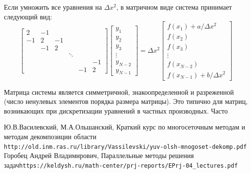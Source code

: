 \documentclass[a4paper, 11pt]{article}
\begin{document}
Если умножить все уравнения на $\Delta x ^2$, в матричном виде система принимает следующий вид:
\begin{equation}
	\begin{bmatrix}
		2  & -1 &   &       \\
		-1 &  2 & -1 \\
		   & -1 &  2 \\
		   &    &   & \ddots \\
		   &    &   &       &  & -1\\
		   &    &   &       & -1 & 2
		
	\end{bmatrix}
	\begin{bmatrix}
		y_1 \\ y_2 \\ y_3 \\ \vdots \\y_{N-2} \\ y_{N-1}
	\end{bmatrix}
	=
	\Delta x^2 
	\begin{bmatrix}
		f(x_1) + a/\Delta x^2 \\
		f(x_2)\\
		f(x_3)\\
		\vdots\\
		f(x_{N-2})\\
		f(x_{N-1}) + b/\Delta x^2 
	\end{bmatrix}
\end{equation}

Матрица системы является симметричной, знакоопределенной и разреженной (число ненулевых элементов порядка размера матрицы). Это типично для матриц, возникающих при дискретизации уравнений в частных производных. Часто 


\begin{thebibliography}{2}
	 Ю.В.Василевский, М.А.Ольшанский, Краткий курс по многосеточным методам и методам декомпозиции области \texttt{http://old.inm.ras.ru/library/Vassilevski/yuv-olsh-mnogoset-dekomp.pdf}
	 Горобец Андрей Владимирович,
	Параллельные методы решения задач\texttt{https://keldysh.ru/math-center/prj-reports/EPrj-04\_lectures.pdf}
\end{thebibliography}
\end{document}
